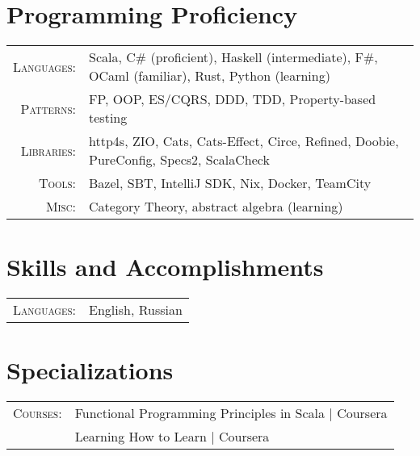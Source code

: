 \documentclass[a4paper,11pt]{article}
\begin{document}
\section{Programming Proficiency}
\begin{tabular}{rl}
  \textsc{Languages:}& Scala, C\# (proficient), Haskell (intermediate), F\#, OCaml (familiar), Rust, Python (learning)\\
  \textsc{Patterns:}& FP, OOP, ES/CQRS, DDD, TDD, Property-based testing\\
  \textsc{Libraries:}& http4s, ZIO, Cats, Cats-Effect, Circe, Refined, Doobie, PureConfig, Specs2, ScalaCheck\\
  \textsc{Tools:}& Bazel, SBT, IntelliJ SDK, Nix, Docker, TeamCity\\
  \textsc{Misc:}& Category Theory, abstract algebra (learning)
\end{tabular}

\section{Skills and Accomplishments}
\begin{tabular}{rl}
  \textsc{Languages:}& English, Russian\\
\end{tabular}

\section{Specializations}
\begin{tabular}{rl}
  \textsc{Courses:}
  &Functional Programming Principles in Scala | Coursera\\
  &Learning How to Learn | Coursera\\
\end{tabular}
\end{document}
